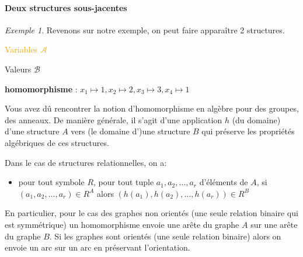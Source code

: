 \documentclass[a4paper,12pt]{article}
\theoremstyle{definition}
\theoremstyle{remark}
\newtheorem*{exemple}{Exemple}%
\begin{document}
\pagebreak

\paragraph{Deux structures sous-jacentes}
\begin{exemple} Revenons sur notre exemple, on peut faire apparaître
    2 structures.

    \begin{multicols}{2}
      \textcolor{orange}{Variables $\mathcal{A}$}


    \textcolor{OliveGreen}{Valeurs $\mathcal{B}$}
  \end{multicols}


    \textbf{homomorphisme} : 
    $x_1\mapsto1,x_2\mapsto2,x_3\mapsto3,x_4\mapsto1$
  \end{exemple}

  Vous avez dû rencontrer la notion d'homomorphisme en algèbre pour des groupes, des anneaux.
  De manière générale, il s'agit d'une application $h$ (du domaine) d'une structure $A$ vers (le domaine d')une structure $B$ qui préserve les propriétés algébriques de ces structures.
  
  Dans le cas de structures relationnelles, on a:
  \begin{itemize}
  \item pour tout symbole $R$, pour tout tuple $a_1,a_2,\ldots,a_r$ d'éléments de $A$, si $(a_1,a_2,\ldots,a_r)\in R^A$ alors $(h(a_1),h(a_2),\ldots,h(a_r))\in R^B$ 
  \end{itemize}

  En particulier, pour le cas des graphes non orientés (une seule relation binaire qui est symmétrique) un homomorphisme envoie une arête du graphe $A$ sur une arête du graphe $B$. Si les graphes sont orientés (une seule relation binaire) alors on envoie un arc sur un arc en préservant l'orientation.  
\end{document}
